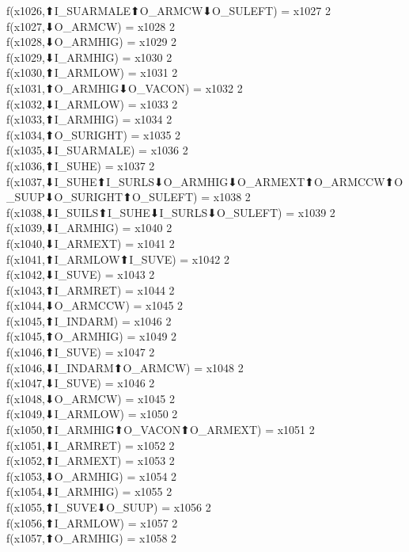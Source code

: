 f(x1026,⬆I_SUARMALE⬆O_ARMCW⬇O_SULEFT) = x1027 {2} \\
f(x1027,⬇O_ARMCW) = x1028 {2} \\
f(x1028,⬇O_ARMHIG) = x1029 {2} \\
f(x1029,⬇I_ARMHIG) = x1030 {2} \\
f(x1030,⬆I_ARMLOW) = x1031 {2} \\
f(x1031,⬆O_ARMHIG⬇O_VACON) = x1032 {2} \\
f(x1032,⬇I_ARMLOW) = x1033 {2} \\
f(x1033,⬆I_ARMHIG) = x1034 {2} \\
f(x1034,⬆O_SURIGHT) = x1035 {2} \\
f(x1035,⬇I_SUARMALE) = x1036 {2} \\
f(x1036,⬆I_SUHE) = x1037 {2} \\
f(x1037,⬇I_SUHE⬆I_SURLS⬇O_ARMHIG⬇O_ARMEXT⬆O_ARMCCW⬆O_SUUP⬇O_SURIGHT⬆O_SULEFT) = x1038 {2} \\
f(x1038,⬇I_SUILS⬆I_SUHE⬇I_SURLS⬇O_SULEFT) = x1039 {2} \\
f(x1039,⬇I_ARMHIG) = x1040 {2} \\
f(x1040,⬇I_ARMEXT) = x1041 {2} \\
f(x1041,⬆I_ARMLOW⬆I_SUVE) = x1042 {2} \\
f(x1042,⬇I_SUVE) = x1043 {2} \\
f(x1043,⬆I_ARMRET) = x1044 {2} \\
f(x1044,⬇O_ARMCCW) = x1045 {2} \\
f(x1045,⬆I_INDARM) = x1046 {2} \\
f(x1045,⬆O_ARMHIG) = x1049 {2} \\
f(x1046,⬆I_SUVE) = x1047 {2} \\
f(x1046,⬇I_INDARM⬆O_ARMCW) = x1048 {2} \\
f(x1047,⬇I_SUVE) = x1046 {2} \\
f(x1048,⬇O_ARMCW) = x1045 {2} \\
f(x1049,⬇I_ARMLOW) = x1050 {2} \\
f(x1050,⬆I_ARMHIG⬆O_VACON⬆O_ARMEXT) = x1051 {2} \\
f(x1051,⬇I_ARMRET) = x1052 {2} \\
f(x1052,⬆I_ARMEXT) = x1053 {2} \\
f(x1053,⬇O_ARMHIG) = x1054 {2} \\
f(x1054,⬇I_ARMHIG) = x1055 {2} \\
f(x1055,⬆I_SUVE⬇O_SUUP) = x1056 {2} \\
f(x1056,⬆I_ARMLOW) = x1057 {2} \\
f(x1057,⬆O_ARMHIG) = x1058 {2} \\
